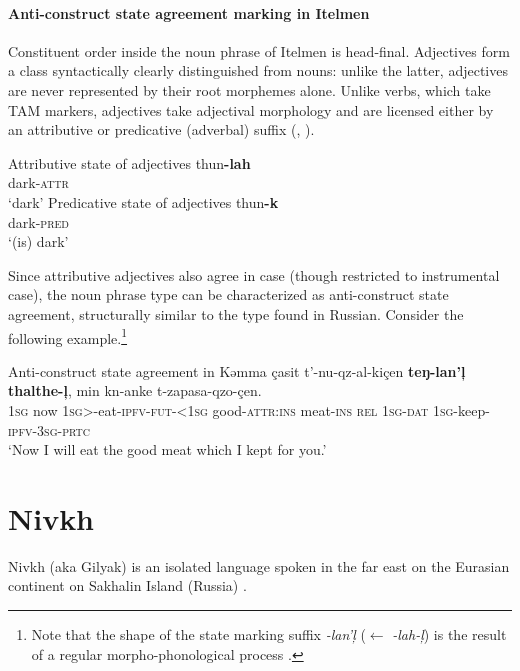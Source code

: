 \paragraph{Anti-construct state agreement marking in Itelmen} \label{itelmen synchr}
Constituent order inside the noun phrase of Itelmen is head-final. Adjectives form a class syntactically clearly distinguished from nouns: unlike the latter, adjectives are never represented by their root morphemes alone. Unlike verbs, which take TAM markers, adjectives take adjectival morphology and are licensed either by an attributive or predicative (adverbal) suffix (\citealt{volodin1997}, \citealt[54]{georg-etal1999}).
\begin{exe}
\ex \label{itelmen ex}  
\begin{xlist}
\ex Attributive state of adjectives
\gll	thun\textbf{-lah}\\
	dark-\textsc{attr}\\
\glt	‘dark’
\ex Predicative state of adjectives
\gll	thun\textbf{-k}\\
	dark-\textsc{pred}\\
\glt	‘(is) dark’
\end{xlist}
\end{exe}
Since attributive adjectives also agree in case (though restricted to instrumental case), the noun phrase type can be characterized as anti-construct state agreement, structurally similar to the type found in Russian. Consider the following example.\footnote{Note that the shape of the state marking suffix \textit{-lan'ļ} ($\leftarrow$ \textit{-lah-ļ}) is the result of a regular morpho-phonological process \citep{georg-etal1999}.}
\begin{exe}
\ex \rm{Anti-construct state agreement in} 
\gll	Kəmma çasit t'-nu-qz-al-kiçen \textbf{teŋ-lan'ļ} \textbf{thalthe-ļ}, min kn-anke t-zapasa-qzo-çen.\\
	\textsc{1sg} now \textsc{1sg}>-eat-\textsc{ipfv-fut-<1sg} good-\textsc{attr:ins} meat-\textsc{ins} \textsc{rel} \textsc{1sg-dat} \textsc{1sg}-keep-\textsc{ipfv-3sg-prtc}\\
\glt	‘Now I will eat the good meat which I kept for you.’
\end{exe}

\section{Nivkh}
Nivkh (aka Gilyak) is an isolated language spoken in the far east on the Eurasian continent on Sakhalin Island (Russia) \citep[222–223]{salminen2007}.

